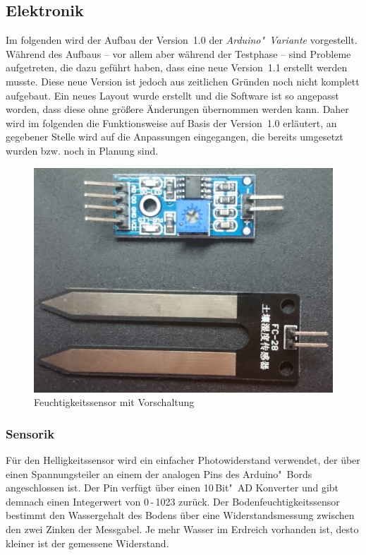 \subsection{Elektronik}
Im folgenden wird der Aufbau der Version~1.0 der \emph{Arduino"~Variante} vorgestellt. 
Während des Aufbaus -- vor allem aber während der Testphase -- sind Probleme aufgetreten, die dazu geführt haben, dass eine neue Version~1.1 erstellt werden musste. 
Diese neue Version ist jedoch aus zeitlichen Gründen noch nicht komplett aufgebaut. 
Ein neues Layout wurde erstellt und die Software ist so angepasst worden, dass diese ohne größere Änderungen übernommen werden kann. 
Daher wird im folgenden die Funktionsweise auf Basis der Version~1.0 erläutert, an gegebener Stelle wird auf die Anpassungen eingegangen, die bereits umgesetzt wurden bzw. noch in Planung sind. 

\begin{figure}[!h]
	\centering
	\includegraphics[width=0.9\linewidth]{bilder/_feuchteSensor1.jpg}
	\caption{Feuchtigkeitssensor mit Vorschaltung}
	\label{fig-SensorVorschaltung}
\end{figure}
			
\subsubsection{Sensorik} \label{sensorik}
Für den Helligkeitssensor wird ein einfacher Photowiderstand verwendet, der über einen Spannungsteiler an einem der analogen Pins des Arduino"~Bords angeschlossen ist. Der Pin verfügt über einen 10\,Bit"~AD Konverter und gibt demnach einen Integerwert von 
0\,-\,1023 zurück.
Der Bodenfeuchtigkeitssensor bestimmt den Wassergehalt des Bodens über eine Widerstandsmessung zwischen den zwei Zinken der Messgabel. 
Je mehr Wasser im Erdreich vorhanden ist, desto kleiner ist der gemessene Widerstand.


